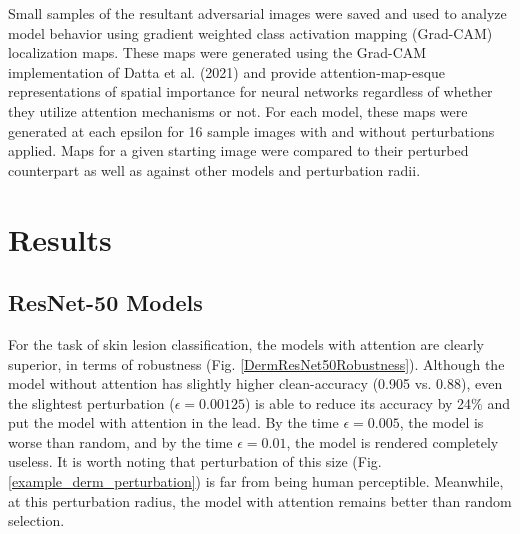 \documentclass[10pt,twocolumn,letterpaper]{article}
\begin{document}
      Small samples of the resultant adversarial images were saved and used to analyze model behavior using gradient weighted class activation mapping (Grad-CAM) \cite{Grad-CAM} localization maps. These maps were generated using the Grad-CAM implementation of Datta et al. (2021) \cite{AttentionSkinCancerClassification} and provide attention-map-esque representations of spatial importance for neural networks regardless of whether they utilize attention mechanisms or not. For each model, these maps were generated at each epsilon for 16 sample images with and without perturbations applied. Maps for a given starting image were compared to their perturbed counterpart as well as against other models and perturbation radii.

  \section{Results}
    \subsection{ResNet-50 Models}
      For the task of skin lesion classification, the models with attention are clearly superior, in terms of robustness (Fig. \ref{DermResNet50Robustness}). Although the model without attention has slightly higher clean-accuracy (0.905 vs. 0.88), even the slightest perturbation ($\epsilon=0.00125$) is able to reduce its accuracy by 24\% and put the model with attention in the lead. By the time $\epsilon=0.005$, the model is worse than random, and by the time $\epsilon=0.01$, the model is rendered completely useless. It is worth noting that perturbation of this size (Fig. \ref{example_derm_perturbation}) is far from being human perceptible. Meanwhile, at this perturbation radius, the model with attention remains better than random selection.
\end{document}

